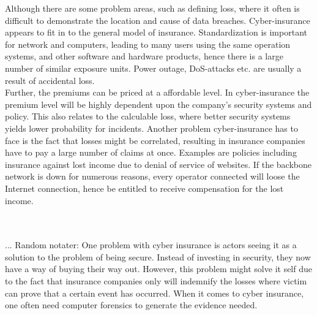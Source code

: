     
 Although there are some problem areas, such as defining loss, where it often is difficult to demonstrate the location and cause of data breaches. Cyber-insurance appears to fit in to the general model of insurance. Standardization is important for network and computers, leading to many users using the same operation systems, and other software and hardware products, hence there is a large number of similar exposure units. Power outage, DoS-attacks etc. are usually a result of accidental loss.
 \\ Further, the premiums can be priced at a affordable level. In cyber-insurance the premium level will be highly dependent upon the company's security systems and policy. This also relates to the calculable loss, where better security systems yields lower probability for incidents. \cite{robinson2012incentives}
 Another problem cyber-insurance has to face is the fact that losses might be correlated, resulting in insurance companies have to pay a large number of claims at once. Examples are policies including insurance against lost income due to denial of service of websites. If the backbone network is down for numerous reasons, every operator connected will loose the Internet connection, hence be entitled to receive compensation for the lost income.   
 
   
 



\\
\\
... Random notater: One problem with cyber insurance is actors seeing it as a solution to the problem of being secure. Instead of investing in security, they now have a way of buying their way out. However, this problem might solve it self due to the fact that insurance companies only will indemnify the losses where victim can prove that a certain event has occurred. When it comes to cyber insurance, one often need computer forensics to generate the evidence needed. 








